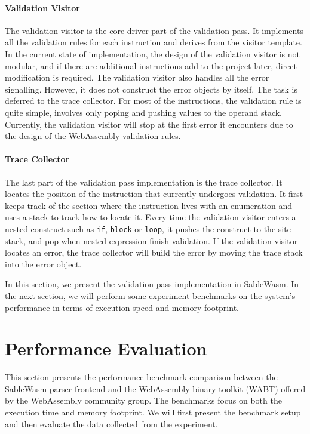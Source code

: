 \paragraph{Validation Visitor}
The validation visitor is the core driver part of the validation pass. It implements all the validation rules for each instruction and derives from the visitor template. In the current state of implementation, the design of the validation visitor is not modular, and if there are additional instructions add to the project later, direct modification is required. The validation visitor also handles all the error signalling. However, it does not construct the error objects by itself. The task is deferred to the trace collector. For most of the instructions, the validation rule is quite simple, involves only poping and pushing values to the operand stack. Currently, the validation visitor will stop at the first error it encounters due to the design of the WebAssembly validation rules.

\paragraph{Trace Collector}
The last part of the validation pass implementation is the trace collector. It locates the position of the instruction that currently undergoes validation. It first keeps track of the section where the instruction lives with an enumeration and uses a stack to track how to locate it. Every time the validation visitor enters a nested construct such as \texttt{if}, \texttt{block} or \texttt{loop}, it pushes the construct to the site stack, and pop when nested expression finish validation. If the validation visitor locates an error, the trace collector will build the error by moving the trace stack into the error object.

In this section, we present the validation pass implementation in SableWasm. In the next section, we will perform some experiment benchmarks on the system's performance in terms of execution speed and memory footprint.

\section{Performance Evaluation}

This section presents the performance benchmark comparison between the SableWasm parser frontend and the WebAssembly binary toolkit (WABT) offered by the WebAssembly community group. The benchmarks focus on both the execution time and memory footprint. We will first present the benchmark setup and then evaluate the data collected from the experiment.

